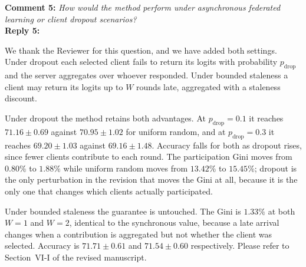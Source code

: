 \documentclass[10pt]{article}
\begin{document}
\noindent
\textbf{Comment 5:} \textit{How would the method perform under asynchronous federated learning or client dropout scenarios?} \\
\noindent
\textbf{Reply 5:} {We thank the Reviewer for this question, and we have added both settings. Under dropout each selected client fails to return its logits with probability $p_{\text{drop}}$ and the server aggregates over whoever responded. Under bounded staleness a client may return its logits up to $W$ rounds late, aggregated with a staleness discount.

Under dropout the method retains both advantages. At $p_{\text{drop}} = 0.1$ it reaches $71.16 \pm 0.69$ against $70.95 \pm 1.02$ for uniform random, and at $p_{\text{drop}} = 0.3$ it reaches $69.20 \pm 1.03$ against $69.16 \pm 1.48$. Accuracy falls for both as dropout rises, since fewer clients contribute to each round. The participation Gini moves from $0.80\%$ to $1.88\%$ while uniform random moves from $13.42\%$ to $15.45\%$; dropout is the only perturbation in the revision that moves the Gini at all, because it is the only one that changes which clients actually participated.

Under bounded staleness the guarantee is untouched. The Gini is $1.33\%$ at both $W = 1$ and $W = 2$, identical to the synchronous value, because a late arrival changes when a contribution is aggregated but not whether the client was selected. Accuracy is $71.71 \pm 0.61$ and $71.54 \pm 0.60$ respectively. Please refer to Section~VI-I of the revised manuscript.}\\
\end{document}
